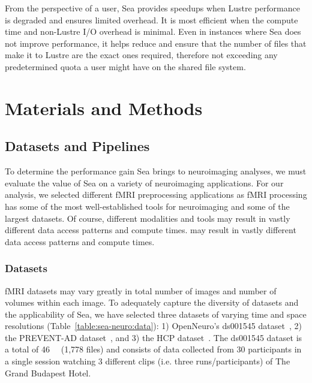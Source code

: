 \documentclass[fleqn,10pt]{wlscirep}
\begin{document}
    From the perspective of a user, Sea provides speedups when
    Lustre performance is degraded and ensures limited overhead. It is most efficient
    when the compute time and non-Lustre I/O overhead is minimal. Even in
    instances where Sea does not improve performance, it helps reduce and ensure
    that the number of files that make it to Lustre are the exact ones required,
    therefore not exceeding any predetermined quota a user might have on the
    shared file system. 
    
    
    
    
    
    
    
    
    
    \section{Materials and Methods}
    
    
    \subsection{Datasets and Pipelines}
    
    To determine the performance gain Sea brings to neuroimaging analyses, we
    must evaluate the value of Sea on a variety of neuroimaging applications.
    For our analysis, we selected different fMRI preprocessing applications as
    fMRI processing has some of the most well-established tools for neuroimaging
    and some of the largest datasets. Of course, different modalities and tools
    may result in vastly different data access patterns and compute times.
    may result in vastly different data access patterns and compute times.
    
    \subsubsection{Datasets}
    fMRI datasets may vary greatly in total number of images and number of
    volumes within each image. To adequately capture the diversity of datasets
    and the applicability of Sea, we have selected three datasets of varying
    time and space resolutions (Table~\ref{table:sea-neuro:data}): 1)
    OpenNeuro's ds001545 dataset~\cite{ds001545}, 2) the PREVENT-AD
    dataset~\cite{preventad}, and 3) the HCP dataset~\cite{HCP}. The ds001545
    dataset is a total of \SI{46}{\giga\byte} (1,778 files) and consists of data
    collected from 30 participants in a single session watching 3 different
    clips (i.e. three runs/participants) of The Grand Budapest Hotel.
    
\end{document}
